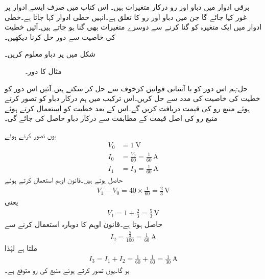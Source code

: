 برقی ادوار میں دباو اور رو درکار متغیرات ہیں۔ اس کتاب میں صرف ایسے ادوار پر غور کیا جائے گا جن میں دباو اور رو کا تعلق  ہے۔انہیں خطی ادوار کہا جاتا ہے۔خطی ادوار میں ایک متغیرہ کو  گنا کرنے سے دوسرے متغیرات بھی  گنا ہو جاتے ہیں۔آئیں خطیت کی خاصیت سے دور حل کرنا دیکھیں۔

شکل  میں  پر دباو معلوم کریں۔
\begin{figure}
\centering
{}
\caption{مثال  کا دور۔}
\label{شکل_مسئلہ_خطیت_دور_حل}
\end{figure}

حل:ہم اس دور کو با آسانی قوانین کرخوف سے حل کر سکتے ہیں۔آئیں اس دور کو خطیت کی خاصیت  کی مدد سے حل کریں۔اس ترکیب میں ہم درکار دباو کو  تصور کرتے ہوئے منبع رو کی قیمت دریافت کریں گے۔اس کے بعد خطیت کو استعمال کرتے ہوئے منبع رو کی اصل قیمت کے مطابقت سے درکار دباو حاصل کی جائے گی۔

یوں  تصور کرتے ہوئے 
\begin{align*}
V_0&=\SI{1}{\volt}\\
I_0&=\frac{V_0}{60}=\frac{1}{60} \, \si{\ampere}\\
I_1&=I_0=\frac{1}{60} \,\si{\ampere}
\end{align*}
حاصل ہوتے ہیں۔قانون اوہم استعمال کرتے ہوئے
\begin{align*}
V_1-V_0=40 \times \frac{1}{60}=\frac{2}{3} \, \si{\volt}
\end{align*}
یعنی
\begin{align*}
V_1=1+\frac{2}{3}=\frac{5}{3}\,\si{\volt}
\end{align*}
حاصل ہوتا ہے۔قانون اوہم کا دوبارہ استعمال کرنے سے
\begin{align*}
I_2=\frac{\frac{5}{3}}{100}=\frac{1}{60} \, \si{\ampere}
\end{align*}
ملتا ہے لہٰذا
\begin{align*}
I_3=I_1+I_2=\frac{1}{60} +\frac{1}{60}=\frac{1}{30}\,\si{\ampere}
\end{align*}
ہو گا۔یوں  تصور کرتے ہوئے منبع کی رو  متوقع ہے۔

